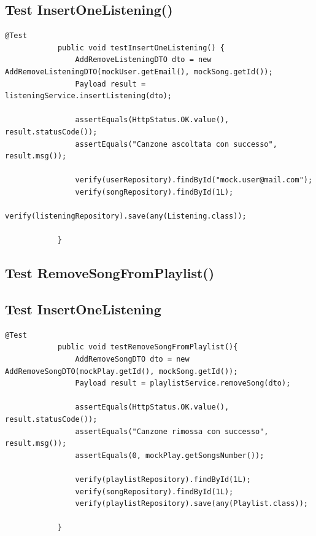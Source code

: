 \documentclass{article}
\begin{document}
		\subsection{Test InsertOneListening()}
		\begin{lstlisting}[style=JavaStyle, label={lst:java_code}]
			@Test
			public void testInsertOneListening() {
				AddRemoveListeningDTO dto = new AddRemoveListeningDTO(mockUser.getEmail(), mockSong.getId());
				Payload result = listeningService.insertListening(dto);
				
				assertEquals(HttpStatus.OK.value(), result.statusCode());
				assertEquals("Canzone ascoltata con successo", result.msg());
				
				verify(userRepository).findById("mock.user@mail.com");
				verify(songRepository).findById(1L);
				verify(listeningRepository).save(any(Listening.class));
				
			}
		\end{lstlisting}
		\newpage
		\subsection{Test RemoveSongFromPlaylist()}
		\subsection{Test InsertOneListening}
		\begin{lstlisting}[style=JavaStyle, label={lst:java_code}]
			@Test
			public void testRemoveSongFromPlaylist(){
				AddRemoveSongDTO dto = new AddRemoveSongDTO(mockPlay.getId(), mockSong.getId());
				Payload result = playlistService.removeSong(dto);
				
				assertEquals(HttpStatus.OK.value(), result.statusCode());
				assertEquals("Canzone rimossa con successo", result.msg());
				assertEquals(0, mockPlay.getSongsNumber());
				
				verify(playlistRepository).findById(1L);
				verify(songRepository).findById(1L);
				verify(playlistRepository).save(any(Playlist.class));
				
			}
		\end{lstlisting}
		\newpage
\end{document}
